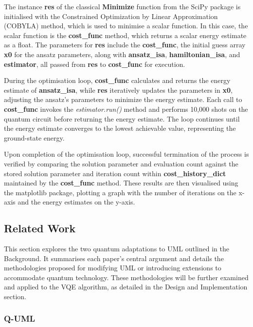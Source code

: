 \documentclass{article}
\begin{document}
{The instance \textbf{res} of the classical \textbf{Minimize} function from the SciPy package is initialised with the Constrained Optimization by Linear Approximation (COBYLA) method, which is used to minimise a scalar function\cite{Minimize}. In this case, the scalar function is the \textbf{cost\_func} method, which returns a scalar energy estimate as a float. The parameters for \textbf{res} include the \textbf{cost\_func}, the initial guess array \textbf{x0} for the ansatz parameters, along with \textbf{ansatz\_isa}, \textbf{hamiltonian\_isa}, and \textbf{estimator}, all passed from \textbf{res} to \textbf{cost\_func} for execution. 

During the optimisation loop, \textbf{cost\_func} calculates and returns the energy estimate of \textbf{ansatz\_isa}, while \textbf{res} iteratively updates the parameters in \textbf{x0}, adjusting the ansatz's parameters to minimize the energy estimate. Each call to \textbf{cost\_func} invokes the \textit{estimator.run()} method and performs 10,000 shots on the quantum circuit before returning the energy estimate. The loop continues until the energy estimate converges to the lowest achievable value, representing the ground-state energy\cite{Tutorial}.

Upon completion of the optimisation loop, successful termination of the process is verified by comparing the solution parameter and evaluation count against the stored solution parameter and iteration count within \textbf{cost\_history\_dict} maintained by the \textbf{cost\_func} method. These results are then visualised using the matplotlib package, plotting a graph with the number of iterations on the x-axis and the energy estimates on the y-axis.

\subsection{Related Work}

This section explores the two quantum adaptations to UML outlined in the Background. It summarises each paper's central argument and details the methodologies proposed for modifying UML or introducing extensions to accommodate quantum technology. These methodologies will be further examined and applied to the VQE algorithm, as detailed in the Design and Implementation section.

\subsubsection{Q-UML}

}
\end{document}
